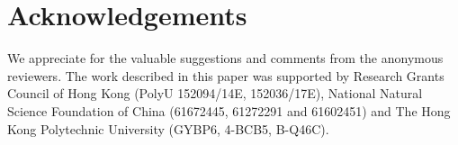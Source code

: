\documentclass[11pt,letterpaper]{article}
\begin{document}
\section*{Acknowledgements}
We appreciate for the valuable suggestions and comments from the anonymous reviewers. The work described in this paper was supported by Research Grants Council of Hong Kong (PolyU 152094/14E, 152036/17E), National Natural Science Foundation of China (61672445, 61272291 and 61602451) and The Hong Kong Polytechnic University (GYBP6, 4-BCB5, B-Q46C).



\end{document}
